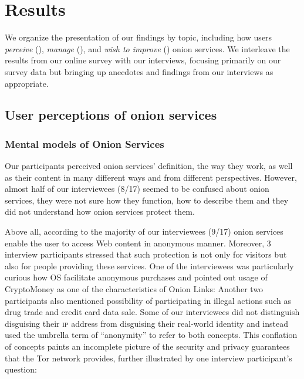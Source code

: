 \section{Results}
\label{sec:results}
We organize the presentation of our findings by topic, including how users
\emph{perceive} (), \emph{manage} (),
and \emph{wish to improve} () onion services.  We interleave the
results from our online survey with our interviews, focusing primarily on our
survey data but bringing up anecdotes and findings from our interviews as
appropriate.

\subsection{User perceptions of onion services}
\label{sec:perception}

\subsubsection{Mental models of Onion Services}


Our participants perceived onion services’ definition, the way they work, as well as their content in many different ways and from different perspectives. However, almost half of our interviewees (8/17) seemed to be confused about onion services, they were not sure how they function, how to describe them and they did not understand how onion services protect them. 

Above all, according to the majority of our interviewees (9/17) onion services enable the user to access Web content in anonymous manner. Moreover, 3 interview participants stressed that such protection is not only for visitors but also for people providing these services. One of the interviewees was particularly curious how OS facilitate anonymous purchases and pointed out usage of CryptoMoney as one of the characteristics of Onion Links:  Another two participants also mentioned possibility of participating in illegal actions such as drug trade and credit card data sale. Some of our interviewees did not distinguish disguising their \textsc{ip}  address from disguising their real-world identity and instead used the umbrella term of “anonymity” to refer
to both concepts. This conflation of concepts paints
an incomplete picture of the security and privacy guarantees
that the Tor network provides, further illustrated
by one interview participant’s question: 

